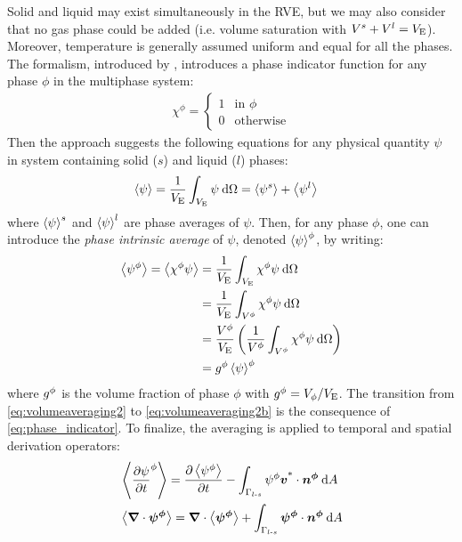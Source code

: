 Solid and liquid may exist simultaneously in the RVE, but we may also consider that no gas phase could be 
added (i.e. volume saturation with $V^s+V^l=V_\text{E}$). Moreover, temperature is generally assumed uniform and equal for all the phases.
The formalism, introduced by \citet{ni_volume-averaged_1991}, introduces a phase indicator function
for any phase $\phi$ in the multiphase system:
\begin{align}
\label{eq:phase_indicator}
\chi^\phi=
\begin{cases}
  1 	& \text{in } \phi \\ 
  0 	& \text{otherwise}
\end{cases}
\end{align}
Then the approach suggests the following equations for any physical quantity $\psi$ in system containing
solid ($s$) and liquid ($l$) phases:
\begin{align}
\label{eq:volumeaveraging1}
& \left \langle \psi \right \rangle = \frac{1}{V_\text{E}} \int_{V_\text{E}} \psi\: \mathrm{d}\Omega = \left \langle \psi^s \right \rangle + \left \langle \psi^l \right \rangle
\end{align}
where $\left \langle \psi \right \rangle^s$ and $\left \langle \psi \right \rangle^l$ are phase averages of $\psi$. Then, for any phase $\phi$, one can introduce the \emph{phase intrinsic average} of $\psi$, denoted $\left \langle \psi \right \rangle^\phi$, by writing:
\begin{subequations}
\begin{align}
\label{eq:volumeaveraging2}
 \left \langle \psi^\phi \right \rangle = \left \langle \chi^\phi \psi \right \rangle 
				&=\frac{1}{V_\text{E}} \int_{V_\text{E}} \chi^\phi \psi\: \mathrm{d}\Omega \\
\label{eq:volumeaveraging2b}
				&=\frac{1}{V_\text{E}} \int_{V^\phi} \chi^\phi \psi\: \mathrm{d}\Omega \\ 
\label{eq:volumeaveraging2c}
				&=\frac{V^\phi}{V_\text{E}} \left( \frac{1}{V^\phi} \int_{V^\phi} \chi^\phi \psi\: \mathrm{d}\Omega \right) \\ 
\label{eq:volumeaveraging2d}
				&= {g^{\phi}}  \left \langle \psi \right \rangle^\phi
\end{align}
\end{subequations}
where ${g^{\phi}} $ is the volume fraction of phase $\phi$ with ${g^{\phi}} =V_\phi/V_\text{E}$. 
The transition from \cref{eq:volumeaveraging2} to \cref{eq:volumeaveraging2b} is the consequence of \cref{eq:phase_indicator}.
To finalize, the averaging is applied to temporal and spatial derivation operators:
\begin{align}
\label{eq:volumeaveraging3}
& \left \langle  \frac{\partial \psi}{\partial t} ^\phi  \right \rangle = \frac{\partial \left \langle \psi^\phi \right \rangle}{\partial t} - \int_{\Gamma_{l\text{-}s}} \psi^\phi \boldsymbol{v^\text{*}} \cdot \boldsymbol{n^\phi}\: \mathrm{d}A \\
\label{eq:volumeaveraging4}
& \left \langle  \boldsymbol{\nabla} \cdot \boldsymbol{\psi^\phi}  \right \rangle = \boldsymbol{\nabla} \cdot \left \langle \boldsymbol{\psi^\phi} \right \rangle + \int_{\Gamma_{l\text{-}s}} \boldsymbol{\psi^\phi} \cdot \boldsymbol{n^\phi}\: \mathrm{d}A
\end{align}

